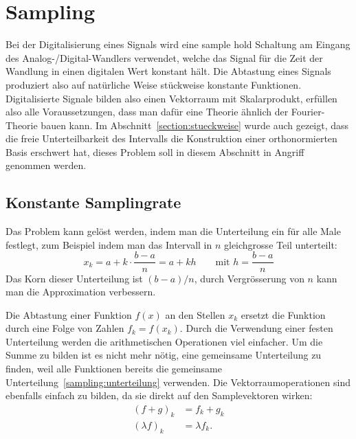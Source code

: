 %
%
%
\section{Sampling%
\label{section:sampling}}
Bei der Digitalisierung eines Signals wird eine sample hold Schaltung am
Eingang des Analog-/Digital-Wandlers verwendet, welche das Signal für die
Zeit der Wandlung in einen digitalen Wert konstant hält.
Die Abtastung eines Signals produziert also auf natürliche Weise
stückweise konstante Funktionen.
Digitalisierte Signale bilden also einen Vektorraum mit Skalarprodukt,
erfüllen also alle Voraussetzungen, dass man dafür eine Theorie ähnlich
der Fourier-Theorie bauen kann.
Im Abschnitt~\ref{section:stueckweise} wurde auch gezeigt, dass die freie
Unterteilbarkeit des Intervalls die Konstruktion einer orthonormierten Basis
erschwert hat, dieses Problem soll in diesem Abschnitt in Angriff genommen
werden.


\subsection{Konstante Samplingrate}
Das Problem kann gelöst werden, indem man die Unterteilung ein für alle
Male festlegt, zum Beispiel indem man das Intervall in $n$ gleichgrosse
Teil unterteilt:
\begin{equation}
x_k = a + k\cdot\frac{b-a}{n} = a + kh
\qquad
\text{mit $\displaystyle h=\frac{b-a}n$}
\label{sampling:unterteilung}
\end{equation}
Das Korn dieser Unterteilung ist $(b-a)/n$, durch Vergrösserung von $n$
kann man die Approximation verbessern.

Die Abtastung einer Funktion $f(x)$ an den Stellen $x_k$ ersetzt
die Funktion durch eine Folge von Zahlen $f_k = f(x_k)$.
Durch die Verwendung einer festen Unterteilung werden die arithmetischen
Operationen viel einfacher.
Um die Summe zu bilden ist es nicht mehr nötig, eine gemeinsame
Unterteilung zu finden, weil alle Funktionen bereits die gemeinsame
Unterteilung~\eqref{sampling:unterteilung} verwenden.
Die Vektorraumoperationen sind ebenfalls einfach zu bilden,
da sie direkt auf den Samplevektoren wirken:
\begin{align*}
(f+g)_k &= f_k + g_k \\
(\lambda f)_k &= \lambda f_k.
\end{align*}

